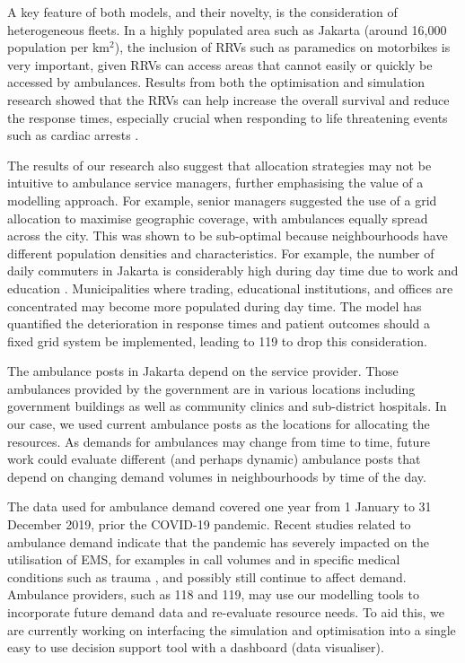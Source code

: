 \documentclass[preprint,12pt]{elsarticle}
\begin{document}
A key feature of both models, and their novelty, is the consideration of heterogeneous fleets. In a highly populated area such as Jakarta (around 16,000 population per km$^2$), the inclusion of RRVs such as paramedics on motorbikes is very important, given RRVs can access areas that cannot easily or quickly be accessed by ambulances. Results from both the optimisation and simulation research showed that the RRVs can help increase the overall survival and reduce the response times, especially crucial when responding to life threatening events such as cardiac arrests \cite{holmen2020shortening}. 

The results of our research also suggest that allocation strategies may not be intuitive to ambulance service managers, further emphasising the value of a modelling approach. For example, senior managers suggested the use of a grid allocation to maximise geographic coverage, with ambulances equally spread across the city. This was shown to be sub-optimal because neighbourhoods have different population densities and characteristics. For example, the number of daily commuters in Jakarta is considerably high during day time due to work and education \cite{BPS_Jakarta_migrasi}. Municipalities where trading, educational institutions, and offices are concentrated may become more populated during day time. The model has quantified the deterioration in response times and patient outcomes should a fixed grid system be implemented, leading to 119 to drop this consideration.

The ambulance posts in Jakarta depend on the service provider. Those ambulances provided by the government are in various locations including government buildings as well as community clinics and sub-district hospitals. In our case, we used current ambulance posts as the locations for allocating the resources. As demands for ambulances may change from time to time, future work could evaluate different (and perhaps dynamic) ambulance posts that depend on changing demand volumes in neighbourhoods by time of the day.

The data used for ambulance demand covered one year from 1 January to 31 December 2019, prior the COVID-19 pandemic. Recent studies related to ambulance demand indicate that the  pandemic has severely impacted on the utilisation of EMS, for examples in call volumes \cite{csan2021effects} and in specific medical conditions such as trauma \cite{ azbel2021effects}, and possibly still continue to affect demand. Ambulance providers, such as 118 and 119, may use our modelling tools to incorporate future demand data and re-evaluate resource needs. To aid this, we are currently working on interfacing the simulation and optimisation into a single easy to use decision support tool with a dashboard (data visualiser). 
\end{document}
